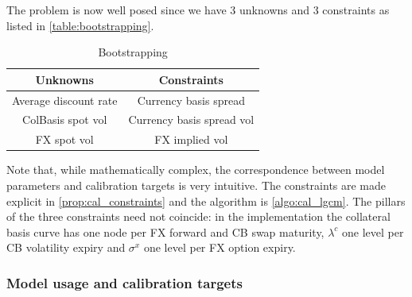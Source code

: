 \documentclass[11pt,english]{amsart}
\theoremstyle{definition}
\begin{document}
The problem is now well posed since we have 3 unknowns and 3 constraints as listed in \autoref{table:bootstrapping}.
\begin{center}
\begin{table}[h!]
\begin{tabular}{|c|c|}
\hline
Unknowns & Constraints \\
\hline
Average discount rate & Currency basis spread \\
ColBasis spot vol & Currency basis spread vol    \\
\hline
FX spot vol & FX implied vol \\
\hline
\end{tabular}
\medskip
\caption{Bootstrapping\label{table:bootstrapping}}
\end{table}
\end{center}

Note that, while mathematically complex, the correspondence between model parameters and calibration targets is very intuitive. The constraints are made explicit in \autoref{prop:cal_constraints} and the algorithm is \autoref{algo:cal_lgcm}. The pillars of the three constraints need not coincide: in the implementation the collateral basis curve has one node per FX forward and CB swap maturity, $\lambda^c$ one level per CB volatility expiry and $\sigma^x$ one level per FX option expiry.


\subsubsection{Model usage and calibration targets}
\end{document}
